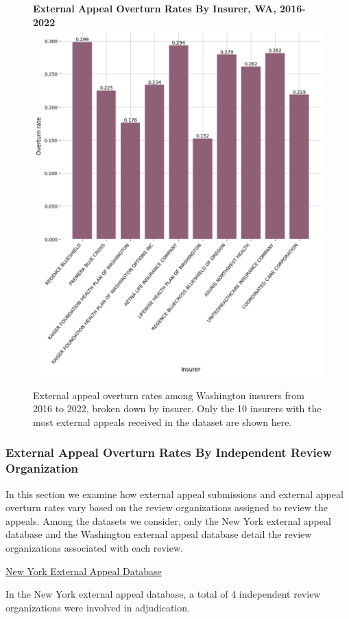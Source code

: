 \documentclass[12pt, a4paper,twoside]{report}
\theoremstyle{plain} %
\theoremstyle{definition} %
\theoremstyle{remark} %
\numberwithin{equation}{chapter}
\begin{document}
		
		\begin{figure}[h!]
			\centering
			\textbf{External Appeal Overturn Rates By Insurer, WA, 2016-2022}
			\includegraphics[width=.8\textwidth]{images/wa_external_appeals/overturn_rates_by_insurer.png}
			\caption{External appeal overturn rates among Washington insurers from 2016 to 2022, broken down by insurer. Only the 10 insurers with the most external appeals received in the dataset are shown here.}
			\label{waexternaloverturnsbyinsurer}
		\end{figure}
		
		\subsubsection{External Appeal Overturn Rates By Independent Review Organization}
		
		In this section we examine how external appeal submissions and external appeal overturn rates vary based on the review organizations assigned to review the appeals. Among the datasets we consider, only the New York external appeal database and the Washington external appeal database detail the review organizations associated with each review.
		
		\underline{New York External Appeal Database}
		
		In the New York external appeal database, a total of 4 independent review organizations were involved in adjudication.
		
\end{document}
